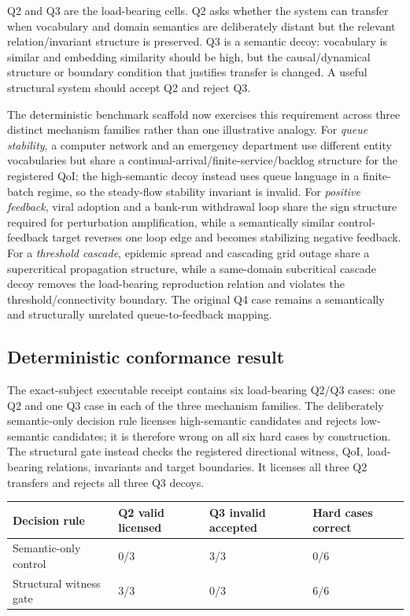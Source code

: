 Q2 and Q3 are the load-bearing cells. Q2 asks whether the system can transfer when vocabulary and domain semantics are deliberately distant but the relevant relation/invariant structure is preserved. Q3 is a semantic decoy: vocabulary is similar and embedding similarity should be high, but the causal/dynamical structure or boundary condition that justifies transfer is changed. A useful structural system should accept Q2 and reject Q3.

The deterministic benchmark scaffold now exercises this requirement across three distinct mechanism families rather than one illustrative analogy. For \emph{queue stability}, a computer network and an emergency department use different entity vocabularies but share a continual-arrival/finite-service/backlog structure for the registered QoI; the high-semantic decoy instead uses queue language in a finite-batch regime, so the steady-flow stability invariant is invalid. For \emph{positive feedback}, viral adoption and a bank-run withdrawal loop share the sign structure required for perturbation amplification, while a semantically similar control-feedback target reverses one loop edge and becomes stabilizing negative feedback. For a \emph{threshold cascade}, epidemic spread and cascading grid outage share a supercritical propagation structure, while a same-domain subcritical cascade decoy removes the load-bearing reproduction relation and violates the threshold/connectivity boundary. The original Q4 case remains a semantically and structurally unrelated queue-to-feedback mapping.

\subsection{Deterministic conformance result}

The exact-subject executable receipt contains six load-bearing Q2/Q3 cases: one Q2 and one Q3 case in each of the three mechanism families. The deliberately semantic-only decision rule licenses high-semantic candidates and rejects low-semantic candidates; it is therefore wrong on all six hard cases by construction. The structural gate instead checks the registered directional witness, QoI, load-bearing relations, invariants and target boundaries. It licenses all three Q2 transfers and rejects all three Q3 decoys.

\begin{center}
\begin{tabularx}{\linewidth}{@{}lYYY@{}}
\toprule
Decision rule & Q2 valid licensed & Q3 invalid accepted & Hard cases correct \\
\midrule
Semantic-only control & 0/3 & 3/3 & 0/6 \\
Structural witness gate & 3/3 & 0/3 & 6/6 \\
\bottomrule
\end{tabularx}
\end{center}

